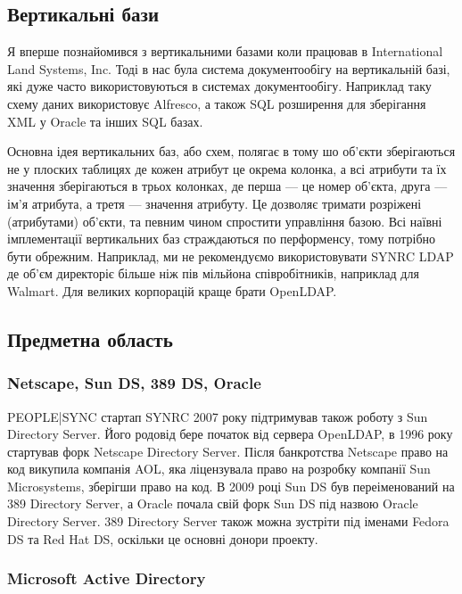 \subsection{Вертикальні бази}

Я вперше познайомився з вертикальними базами коли працював в International Land Systems, Inc. Тоді в нас була система документообігу на вертикальній базі, які дуже часто використовуються в системах документообігу. Наприклад таку схему даних використовує Alfresco, а також SQL розширення для зберігання XML у Oracle та інших SQL базах.

Основна ідея вертикальних баз, або схем, полягає в тому шо об'єкти зберігаються не у плоских таблицях де кожен атрибут це окрема колонка, а всі атрибути та їх значення зберігаються в трьох колонках, де перша — це номер об'єкта, друга — ім'я атрибута, а третя — значення атрибуту. Це дозволяє тримати розріжені (атрибутами) об'єкти, та певним чином спростити управління базою. Всі наївні імплементації вертикальних баз страждаються по перформенсу, тому потрібно бути обрежним. Наприклад, ми не рекомендуємо використовувати SYNRC LDAP де об'єм директоріє більше ніж пів мільйона співробітників, наприклад для Walmart. Для великих корпорацій краще брати OpenLDAP.

\subsection{Предметна область}

\subsubsection{Netscape, Sun DS, 389 DS, Oracle}

PEOPLE|SYNC стартап SYNRC 2007 року підтримував також роботу з Sun Directory Server. Його родовід бере початок від сервера OpenLDAP, в 1996 року стартував форк Netscape Directory Server. Після банкротства Netscape право на код викупила компанія AOL, яка ліцензувала право на розробку компанії Sun Microsystems, зберігши право на код. В 2009 році Sun DS був переіменований на 389 Directory Server, а Oracle почала свій форк Sun DS під назвою Oracle Directory Server. 389 Directory Server також можна зустріти під іменами Fedora DS та Red Hat DS, оскільки це основні донори проекту.

\subsubsection{Microsoft Active Directory}

